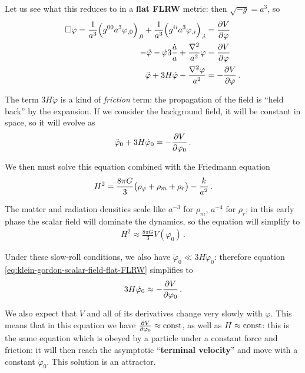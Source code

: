 \documentclass[main.tex]{subfiles}
\begin{document}
Let us see what this reduces to in a \textbf{flat FLRW} metric: then \(\sqrt{-g} = a^3\), so 
%
\begin{align}
\square \varphi = \frac{1}{a^3} \qty(g^{00} a^3\varphi_{, 0})_{, 0}
+ \frac{1}{a^3} \qty(g^{ii} a^3\varphi_{, i})_{, i} &= \pdv{V}{\varphi }  \\
- \ddot{\varphi} - \dot{\varphi} 3\frac{\dot{a}}{a}
+ \frac{\nabla^2}{a^2} \varphi 
&= \pdv{V}{ \varphi }  \\
\ddot{\varphi} + 3 H \dot{\varphi} - \frac{\nabla^2 \varphi }{a^2} &= - \pdv{V}{\varphi }
\,.
\end{align}

The term \(3 H \dot{\varphi}\) is a kind of \emph{friction} term: the propagation of the field is ``held back'' by the expansion. 
If we consider the background field, it will be constant in space, so it will evolve as 
%
\begin{align} \label{eq:klein-gordon-scalar-field-flat-FLRW}
\ddot{\varphi}_0 + 3 H \dot{\varphi}_0 = - \pdv{V}{\varphi_0 }
\,.
\end{align}

We then must solve this equation combined with the Friedmann equation 
%
\begin{align}
H^2 = \frac{8 \pi G}{3} \qty(\rho _\varphi + \rho _m + \rho _r) - \frac{k}{a^2}
\,.
\end{align}

The matter and radiation densities scale like \(a^{-3}\) for \(\rho _m\), \(a^{-4}\) for \(\rho _r\); in this early phase the scalar field will dominate the dynamics, so the equation will simplify to 
%
\begin{align} \label{eq:hubble-rate-scalar-field-flat-FLRW}
H^2 \approx \frac{8 \pi G}{3} V(\varphi_0 )
\,.
\end{align}

Under these slow-roll conditions, we also have \(\ddot{\varphi}_0 \ll 3 H \dot{\varphi}_0\): therefore equation \eqref{eq:klein-gordon-scalar-field-flat-FLRW} simplifies to
%
\begin{align} \label{eq:approx-EOM-scalar-field-flat-FLRW}
3 H \dot{\varphi}_{0} \approx - \pdv{V}{\varphi_0 }
\,.
\end{align}

We also expect that \(V\) and all of its derivatives change very slowly with \(\varphi \). 
This means that in this equation we have \(\pdv{V}{\varphi_0 } \approx \text{const}\), as well as \(H \approx \text{const}\): this is the same equation which is obeyed by a particle under a constant force and friction: it will then reach the asymptotic ``\textbf{terminal velocity}'' and move with a constant \(\dot{\varphi}_0 \). This solution is an attractor. 
\end{document}
